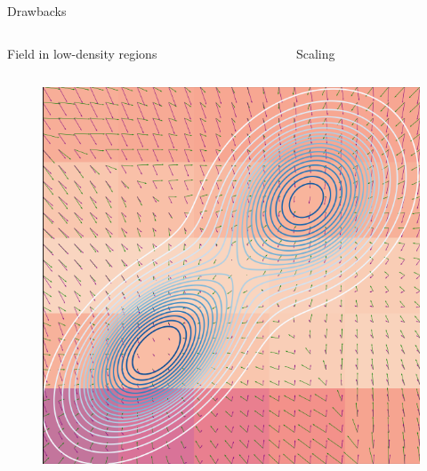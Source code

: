 \documentclass[aspectratio=169,xcolor=dvipsnames]{beamer}
\begin{document}
\begin{frame}{Drawbacks}
  \begin{columns}
    \begin{column}{0.4\textwidth}
      \centering
      Field in low-density regions
    \end{column}
    \begin{column}{0.6\textwidth}
      \centering
      Scaling
    \end{column}
  \end{columns}

  \begin{columns}
    \begin{column}{0.4\textwidth}
      \centering
      \begin{figure}
        \centering
        \includegraphics[height=0.32\textheight]{figs/gen/score_field_training_0.png}
      \end{figure}


\end{column}
\end{columns}
\end{frame}
\end{document}
